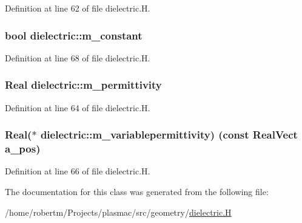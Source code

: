 Definition at line 62 of file dielectric.\+H.

\subsubsection[{\texorpdfstring{m\+\_\+constant}{m_constant}}]{\setlength{\rightskip}{0pt plus 5cm}bool dielectric\+::m\+\_\+constant\hspace{0.3cm}{\ttfamily [protected]}}\hypertarget{classdielectric_a4cd612354ef95a10f47357320ec96fc5}{}\label{classdielectric_a4cd612354ef95a10f47357320ec96fc5}


Definition at line 68 of file dielectric.\+H.

\subsubsection[{\texorpdfstring{m\+\_\+permittivity}{m_permittivity}}]{\setlength{\rightskip}{0pt plus 5cm}Real dielectric\+::m\+\_\+permittivity\hspace{0.3cm}{\ttfamily [protected]}}\hypertarget{classdielectric_a99db20e801c9230a3c428d4e6e646801}{}\label{classdielectric_a99db20e801c9230a3c428d4e6e646801}


Definition at line 64 of file dielectric.\+H.

\subsubsection[{\texorpdfstring{m\+\_\+variablepermittivity}{m_variablepermittivity}}]{\setlength{\rightskip}{0pt plus 5cm}Real($\ast$ dielectric\+::m\+\_\+variablepermittivity) (const Real\+Vect a\+\_\+pos)\hspace{0.3cm}{\ttfamily [protected]}}\hypertarget{classdielectric_a8ea94535dc7db4c14c844d9807ea62bc}{}\label{classdielectric_a8ea94535dc7db4c14c844d9807ea62bc}


Definition at line 66 of file dielectric.\+H.



The documentation for this class was generated from the following file\+:\begin{DoxyCompactItemize}
\item 
/home/robertm/\+Projects/plasmac/src/geometry/\hyperlink{dielectric_8H}{dielectric.\+H}\end{DoxyCompactItemize}
